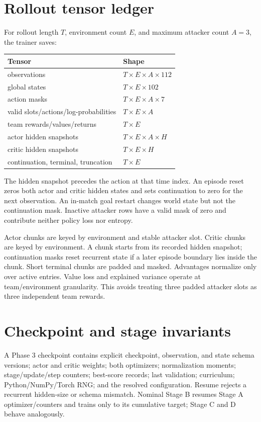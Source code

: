 \documentclass[12pt,twocolumn]{article}
\begin{document}
\section{Rollout tensor ledger}
For rollout length $T$, environment count $E$, and maximum attacker count $A=3$, the trainer saves:
\begin{center}
\small
\begin{tabular}{p{}p{}}
\toprule Tensor & Shape \\
\midrule observations & $T\times E\times A\times112$ \\
global states & $T\times E\times102$ \\
action masks & $T\times E\times A\times7$ \\
valid slots/actions/log-probabilities & $T\times E\times A$ \\
team rewards/values/returns & $T\times E$ \\
actor hidden snapshots & $T\times E\times A\times H$ \\
critic hidden snapshots & $T\times E\times H$ \\
continuation, terminal, truncation & $T\times E$ \\
\bottomrule
\end{tabular}
\normalsize
\end{center}
The hidden snapshot precedes the action at that time index. An episode reset zeros both actor and
critic hidden states and sets continuation to zero for the next observation. An in-match goal
restart changes world state but not the continuation mask. Inactive attacker rows have a valid
mask of zero and contribute neither policy loss nor entropy.

Actor chunks are keyed by environment and stable attacker slot. Critic chunks are keyed by
environment. A chunk starts from its recorded hidden snapshot; continuation masks reset recurrent
state if a later episode boundary lies inside the chunk. Short terminal chunks are padded and
masked. Advantages normalize only over active entries. Value loss and explained variance operate
at team/environment granularity. This avoids treating three padded attacker slots as three
independent team rewards.

\section{Checkpoint and stage invariants}
A Phase 3 checkpoint contains explicit checkpoint, observation, and state schema versions; actor
and critic weights; both optimizers; normalization moments; stage/update/step counters; best-score
records; last validation; curriculum; Python/NumPy/Torch RNG; and the resolved configuration.
Resume rejects a recurrent hidden-size or schema mismatch. Nominal Stage B resumes Stage A
optimizer/counters and trains only to its cumulative target; Stage C and D behave analogously.
\end{document}
